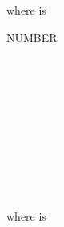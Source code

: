 where  is

\begin{syntax}
  \begin{1=}
    \begin{1+}
       NUMBER
      \begin{1=}
        \identifier \\
        \literal
      \end{1=} \\

      \begin{1=}
         \\
         \\
      \end{1=}

      \begin{1=}
        \identifier \\
        \literal
      \end{1=}
    \end{1+} \\


  \end{1=}
\end{syntax}

where  is

